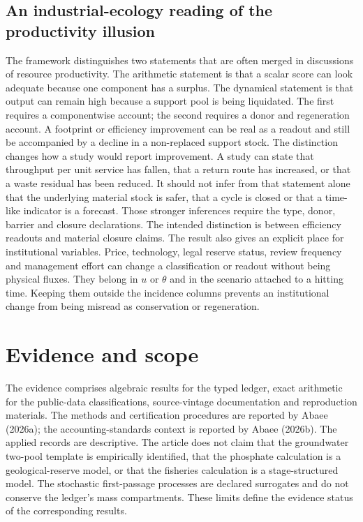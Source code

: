 \documentclass[11pt]{article}
\begin{document}
\subsection{An industrial-ecology reading of the productivity illusion}
The framework distinguishes two statements that are often merged in discussions of resource productivity. The arithmetic statement is that a scalar score can look adequate because one component has a surplus. The dynamical statement is that output can remain high because a support pool is being liquidated. The first requires a componentwise account; the second requires a donor and regeneration account. A footprint or efficiency improvement can be real as a readout and still be accompanied by a decline in a non-replaced support stock.
The distinction changes how a study would report improvement. A study can state that throughput per unit service has fallen, that a return route has increased, or that a waste residual has been reduced. It should not infer from that statement alone that the underlying material stock is safer, that a cycle is closed or that a time-like indicator is a forecast. Those stronger inferences require the type, donor, barrier and closure declarations. The intended distinction is between efficiency readouts and material closure claims.
The result also gives an explicit place for institutional variables. Price, technology, legal reserve status, review frequency and management effort can change a classification or readout without being physical fluxes. They belong in \(u\) or \(\theta\) and in the scenario attached to a hitting time. Keeping them outside the incidence columns prevents an institutional change from being misread as conservation or regeneration.
\section{Evidence and scope}
The evidence comprises algebraic results for the typed ledger, exact arithmetic for the public-data classifications, source-vintage documentation and reproduction materials. The methods and certification procedures are reported by Abaee (2026a); the accounting-standards context is reported by Abaee (2026b).
The applied records are descriptive. The article does not claim that the groundwater two-pool template is empirically identified, that the phosphate calculation is a geological-reserve model, or that the fisheries calculation is a stage-structured model. The stochastic first-passage processes are declared surrogates and do not conserve the ledger's mass compartments. These limits define the evidence status of the corresponding results.
\end{document}
